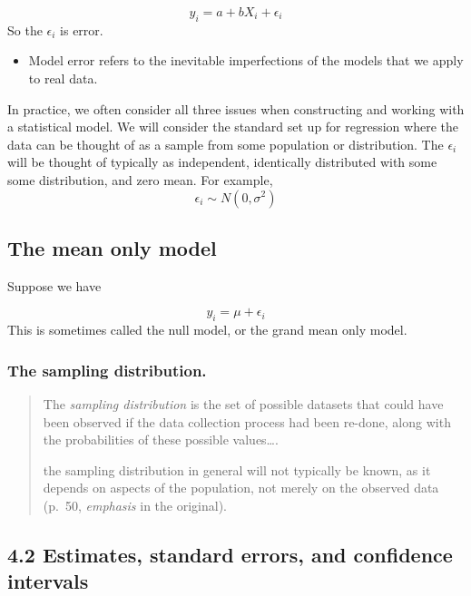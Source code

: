 \documentclass[
]{article}
\providecommand{\tightlist}{%
  \setlength{\itemsep}{0pt}\setlength{\parskip}{0pt}}
\begin{document}
\[y_i=a+bX_i+\epsilon_i\] So the \(\epsilon_i\) is error.

\begin{itemize}
\tightlist
\item
  Model error refers to the inevitable imperfections of the models that
  we apply to real data.
\end{itemize}

In practice, we often consider all three issues when constructing and
working with a statistical model. We will consider the standard set up
for regression where the data can be thought of as a sample from some
population or distribution. The \(\epsilon_i\) will be thought of
typically as independent, identically distributed with some some
distribution, and zero mean. For example,
\[\epsilon_i \sim N(0,\sigma^2) \]

\hypertarget{the-mean-only-model}{%
\subsection{The mean only model}\label{the-mean-only-model}}

Suppose we have

\[y_i=\mu+\epsilon_i\] This is sometimes called the null model, or the
grand mean only model.

\hypertarget{the-sampling-distribution.}{%
\subsubsection{The sampling
distribution.}\label{the-sampling-distribution.}}

\begin{quote}
The \emph{sampling distribution} is the set of possible datasets that
could have been observed if the data collection process had been
re-done, along with the probabilities of these possible values\ldots.

the sampling distribution in general will not typically be known, as it
depends on aspects of the population, not merely on the observed data
(p.~50, \emph{emphasis} in the original).
\end{quote}

\hypertarget{estimates-standard-errors-and-confidence-intervals}{%
\subsection{4.2 Estimates, standard errors, and confidence
intervals}\label{estimates-standard-errors-and-confidence-intervals}}
\end{document}
